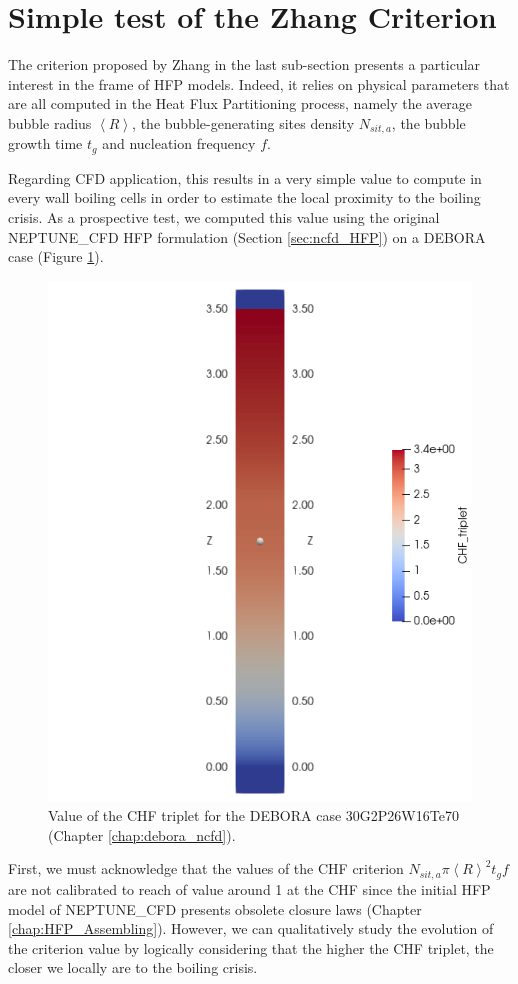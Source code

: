 \section{Simple test of the Zhang Criterion}
\label{sec:chf_test_debora}

The criterion proposed by Zhang in the last sub-section presents a particular interest in the frame of HFP models. Indeed, it relies on physical parameters that are all computed in the Heat Flux Partitioning process, namely the average bubble radius $\left<R\right>$, the bubble-generating sites density $N_{sit,a}$, the bubble growth time  $t_{g}$ and nucleation frequency $f$. 

\npar

Regarding CFD application, this results in a very simple value to compute in every wall boiling cells in order to estimate the local proximity to the boiling crisis. As a prospective test, we computed this value using the original NEPTUNE\_CFD HFP formulation (Section \ref{sec:ncfd_HFP}) on a DEBORA case (Figure \ref{fig:debora_chf_criterion}).


\begin{figure}[!h]
\centering
\includegraphics[width=0.45\linewidth]{img/chf/chf_crit/CHF_triplet_Te70_DEBORA.png}
\caption{Value of the CHF triplet for the DEBORA case 30G2P26W16Te70 (Chapter \ref{chap:debora_ncfd}).}
\label{fig:debora_chf_criterion}
\end{figure}

\npar

First, we must acknowledge that the values of the CHF criterion $N_{sit,a} \pi \left<R\right>^{2} t_{g}f$ are not calibrated to reach of value around 1 at the CHF since the initial HFP model of NEPTUNE\_CFD presents obsolete closure laws (Chapter \ref{chap:HFP_Assembling}). However, we can qualitatively study the evolution of the criterion value by logically considering that the higher the CHF triplet, the closer we locally are to the boiling crisis.


